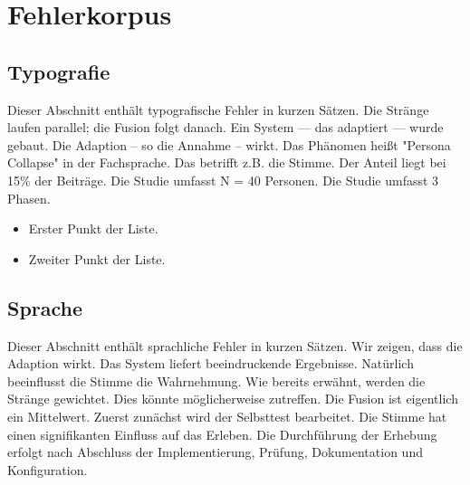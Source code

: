 \chapter{Fehlerkorpus} %
\label{chap:fehler}

\section{Typografie}
\label{sec:typo}

Dieser Abschnitt enthält typografische Fehler in kurzen Sätzen.
Die Stränge laufen parallel; die Fusion folgt danach. %
Ein System — das adaptiert — wurde gebaut. %
Die Adaption -- so die Annahme -- wirkt. %
Das Phänomen heißt "Persona Collapse" in der Fachsprache. %
Das betrifft z.B. die Stimme. %
Der Anteil liegt bei 15\% der Beiträge. %
Die Studie umfasst N = 40 Personen. %
Die Studie umfasst 3 Phasen. %

\begin{itemize}
    \item Erster Punkt der Liste.

    \item Zweiter Punkt der Liste. %
\end{itemize}

\section{Sprache}
\label{sec:sprache}

Dieser Abschnitt enthält sprachliche Fehler in kurzen Sätzen.
Wir zeigen, dass die Adaption wirkt. %
Das System liefert beeindruckende Ergebnisse. %
Natürlich beeinflusst die Stimme die Wahrnehmung. %
Wie bereits erwähnt, werden die Stränge gewichtet. %
Dies könnte möglicherweise zutreffen. %
Die Fusion ist eigentlich ein Mittelwert. %
Zuerst zunächst wird der Selbsttest bearbeitet. %
Die Stimme hat einen signifikanten Einfluss auf das Erleben. %
Die Durchführung der Erhebung erfolgt nach Abschluss der Implementierung, Prüfung, Dokumentation und Konfiguration. %


